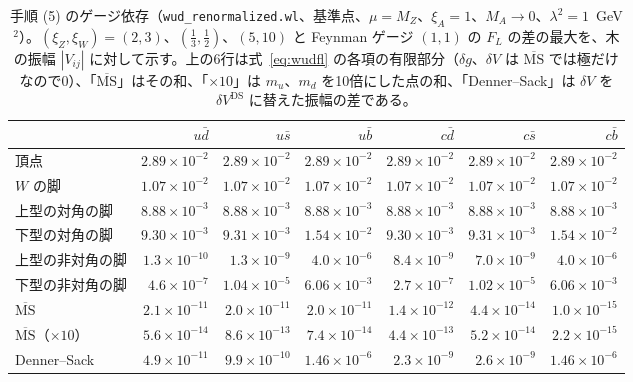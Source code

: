 \documentclass[a4paper,10pt]{ltjsarticle}
\newcommand{\MSbar}{\overline{\mathrm{MS}}}
\begin{document}
\begin{table}[tbp]
\centering\footnotesize
\caption{手順 (5) のゲージ依存（\texttt{wud\_renormalized.wl}、基準点、$\mu=M_Z$、$\xi_A=1$、$M_A\to0$、$\lambda^2=1$~GeV$^2$）。$(\xi_Z,\xi_W)=(2,3)$、$(\frac13,\frac12)$、$(5,10)$ と Feynman ゲージ $(1,1)$ の $F_L$ の差の最大を、木の振幅 $|V_{ij}|$ に対して示す。上の6行は式~\eqref{eq:wudfl} の各項の有限部分（$\delta g$、$\delta V$ は $\MSbar$ では極だけなので0）、「$\MSbar$」はその和、「$\times10$」は $m_u$、$m_d$ を10倍にした点の和、「Denner--Sack」は $\delta V$ を $\delta V^{\mathrm{DS}}$ に替えた振幅の差である。}
\label{tab:wud}
\begin{tabular}{lrrrrrr}
\toprule
 & $u\bar d$ & $u\bar s$ & $u\bar b$ & $c\bar d$ & $c\bar s$ & $c\bar b$ \\
\midrule
頂点 & $2.89\times10^{-2}$ & $2.89\times10^{-2}$ & $2.89\times10^{-2}$ & $2.89\times10^{-2}$ & $2.89\times10^{-2}$ & $2.89\times10^{-2}$ \\
$W$ の脚 & $1.07\times10^{-2}$ & $1.07\times10^{-2}$ & $1.07\times10^{-2}$ & $1.07\times10^{-2}$ & $1.07\times10^{-2}$ & $1.07\times10^{-2}$ \\
上型の対角の脚 & $8.88\times10^{-3}$ & $8.88\times10^{-3}$ & $8.88\times10^{-3}$ & $8.88\times10^{-3}$ & $8.88\times10^{-3}$ & $8.88\times10^{-3}$ \\
下型の対角の脚 & $9.30\times10^{-3}$ & $9.31\times10^{-3}$ & $1.54\times10^{-2}$ & $9.30\times10^{-3}$ & $9.31\times10^{-3}$ & $1.54\times10^{-2}$ \\
上型の非対角の脚 & $1.3\times10^{-10}$ & $1.3\times10^{-9}$ & $4.0\times10^{-6}$ & $8.4\times10^{-9}$ & $7.0\times10^{-9}$ & $4.0\times10^{-6}$ \\
下型の非対角の脚 & $4.6\times10^{-7}$ & $1.04\times10^{-5}$ & $6.06\times10^{-3}$ & $2.7\times10^{-7}$ & $1.02\times10^{-5}$ & $6.06\times10^{-3}$ \\
\midrule
$\MSbar$ & $2.1\times10^{-11}$ & $2.0\times10^{-11}$ & $2.0\times10^{-11}$ & $1.4\times10^{-12}$ & $4.4\times10^{-14}$ & $1.0\times10^{-15}$ \\
$\MSbar$（$\times10$） & $5.6\times10^{-14}$ & $8.6\times10^{-13}$ & $7.4\times10^{-14}$ & $4.4\times10^{-13}$ & $5.2\times10^{-14}$ & $2.2\times10^{-15}$ \\
Denner--Sack & $4.9\times10^{-11}$ & $9.9\times10^{-10}$ & $1.46\times10^{-6}$ & $2.3\times10^{-9}$ & $2.6\times10^{-9}$ & $1.46\times10^{-6}$ \\
\bottomrule
\end{tabular}
\end{table}
\end{document}
